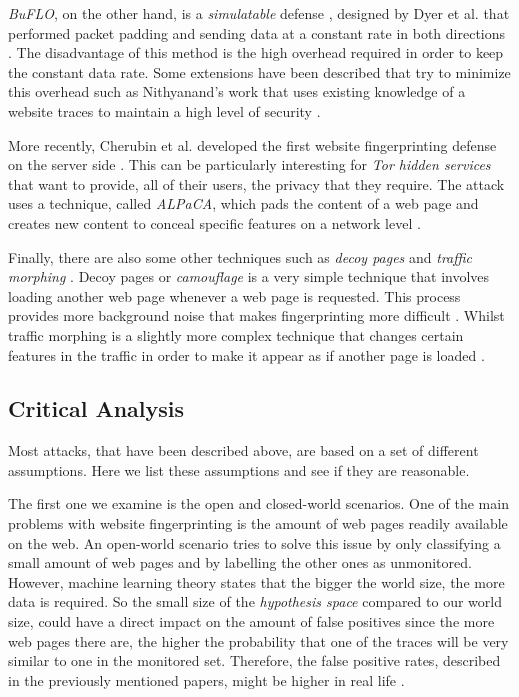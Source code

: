 \textit{BuFLO}, on the other hand, is a \textit{simulatable} defense \cite{wang_cai_johnson_nithyanand_goldberg_2014}, designed by Dyer et al. that performed packet padding and sending data at a constant rate in both directions \cite{dyer2012peek}.
The disadvantage of this method is the high overhead required in order to keep the constant data rate.
Some extensions have been described that try to minimize this overhead such as  Nithyanand's work that uses existing knowledge of a website traces to maintain a high level of security \cite{nithyanand2014glove}.

More recently, Cherubin et al. developed the first website fingerprinting defense on the server side \cite{cherubin2017website}.
This can be particularly interesting for \textit{Tor hidden services} that want to provide, all of their users, the privacy that they require.
The attack uses a technique, called \textit{ALPaCA}, which pads the content of a web page and creates new content to conceal specific features on a network level \cite{cherubin2017website}.

Finally, there are also some other techniques such as \textit{decoy pages} and \textit{traffic morphing} \cite{wright2009traffic,panchenko1}.
Decoy pages or \textit{camouflage} is a very simple technique that involves loading another web page whenever a web page is requested.
This process provides more background noise that makes fingerprinting more difficult \cite{panchenko1}.
Whilst traffic morphing is a slightly more complex technique that changes certain features in the traffic in order to make it appear as if another page is loaded \cite{wright2009traffic}.

\subsection{Critical Analysis}

Most attacks, that have been described above, are based on a set of different assumptions.
Here we list these assumptions and see if they are reasonable.

The first one we examine is the open and closed-world scenarios.
One of the main problems with website fingerprinting is the amount of web pages readily available on the web.
An open-world scenario tries to solve this issue by only classifying a small amount of web pages and by labelling the other ones as unmonitored.
However, machine learning theory states that the bigger the world size, the more data is required.
So the small size of the \textit{hypothesis space} compared to our world size, could have a direct impact on the amount of false positives
since the more web pages there are, the higher the probability that one of the traces will be very similar to one in the monitored set.
Therefore, the false positive rates, described in the previously mentioned papers, might be higher in real life \cite{wfpcritique}.

